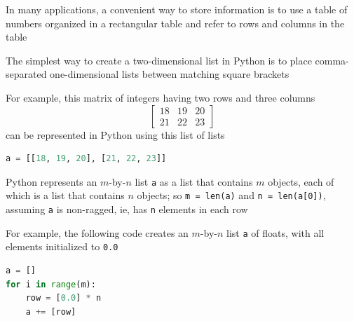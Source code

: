 \documentclass[8pt,a4paper,compress]{beamer}
\begin{document}
\begin{frame}[fragile]
\pause

In many applications, a convenient way to store information is to use a table of numbers organized in a rectangular table and refer to rows and columns in the table

\pause\bigskip

The simplest way to create a two-dimensional list in Python is to place comma-separated one-dimensional lists between matching square brackets 

\pause\bigskip

For example, this matrix of integers having two rows and three columns 
\[
\begin{bmatrix}
18 & 19 & 20 \\ 
21 & 22 & 23
\end{bmatrix}
\]
can be represented in Python using this list of lists

\smallskip

\begin{lstlisting}[language=Python,style=focusin]
a = [[18, 19, 20], [21, 22, 23]]
\end{lstlisting}

\pause\bigskip

Python represents an $m$-by-$n$ list \lstinline{a} as a list that contains $m$ objects, each of which is a list that contains $n$ objects; so \lstinline{m = len(a)} and \lstinline{n = len(a[0])}, assuming \lstinline{a} is non-ragged, ie, has \lstinline{n} elements in each row

\pause\bigskip

For example, the following code creates an $m$-by-$n$ list \lstinline{a} of floats, with all elements initialized to \lstinline{0.0}

\smallskip

\begin{lstlisting}[language=Python,style=focusin]
a = []
for i in range(m):
    row = [0.0] * n
    a += [row]
\end{lstlisting}
\end{frame}
\end{document}
